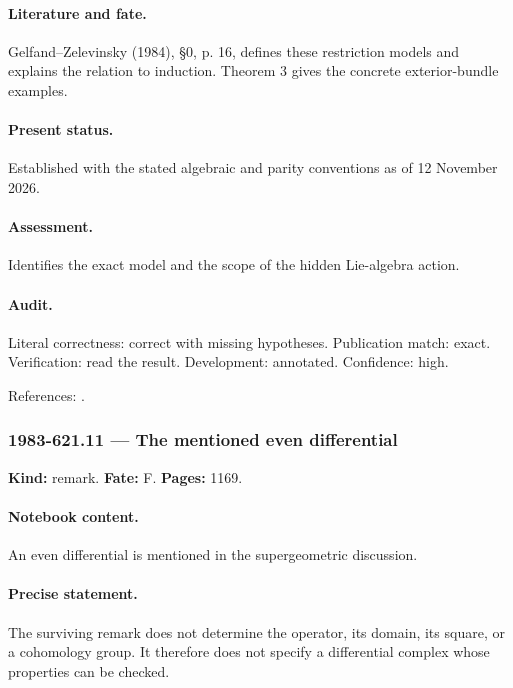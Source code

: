 \paragraph{Literature and fate.} Gelfand–Zelevinsky (1984), \S0, p. 16, defines these restriction models and explains the relation to induction. Theorem 3 gives the concrete exterior-bundle examples.

\paragraph{Present status.} Established with the stated algebraic and parity conventions as of 12 November 2026.

\paragraph{Assessment.} Identifies the exact model and the scope of the hidden Lie-algebra action.

\paragraph{Audit.} Literal correctness: correct with missing hypotheses. Publication match: exact. Verification: read the result. Development: annotated. Confidence: high.

\noindent References: \citep{gelfandzelevinsky1984models}.\par

\subsubsection{1983-621.11 --- The mentioned even differential}

\label{item:1983-621.11}

\noindent\textbf{Kind:} remark. \textbf{Fate:} F. \textbf{Pages:} 1169.\par

\paragraph{Notebook content.} An even differential is mentioned in the supergeometric discussion.

\paragraph{Precise statement.} The surviving remark does not determine the operator, its domain, its square, or a cohomology group. It therefore does not specify a differential complex whose properties can be checked.

